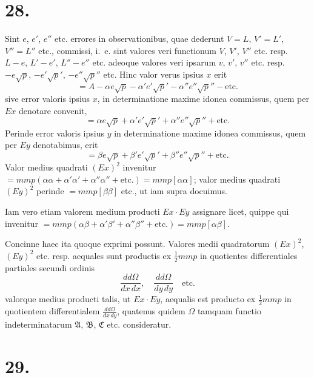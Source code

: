 \documentclass[12pt,a4paper]{book}
\begin{document}
\section*{28.}
\label{sec:art28}

Sint $e$, $e'$, $e''$ etc. errores in observationibus, quae dederunt $V=L$, $V'=L'$, $V''=L''$ etc., commissi, i.~e. sint valores veri functionum $V$, $V'$, $V''$ etc. resp. $L-e$, $L'-e'$, $L''-e''$ etc. adeoque valores veri ipsarum $v$, $v'$, $v''$ etc. resp. $-e\surd p$, $-e'\surd p'$, $-e''\surd p''$ etc. Hinc valor verus ipsius $x$ erit
%
\begin{equation*}
=A-\alpha e\surd p-\alpha'e'\surd p'-\alpha''e''\surd p''-\text{etc.}
\end{equation*}
sive error valoris ipsius $x$, in determinatione maxime idonea commissus, quem per $Ex$ denotare convenit,
%
\begin{equation*}
=\alpha e\surd p+\alpha'e'\surd p'+\alpha''e''\surd p''+\text{etc.}
\end{equation*}
Perinde error valoris ipsius $y$ in determinatione maxime idonea commissus, quem per $Ey$ denotabimus, erit
%
\begin{equation*}
=\beta e\surd p+\beta'e'\surd p'+\beta''e''\surd p''+\text{etc.}
\end{equation*}
Valor medius quadrati $(Ex)^2$ invenitur $=mmp(\alpha\alpha+\alpha'\alpha'+\alpha''\alpha''+\text{etc.})=mmp[\alpha\alpha]$; valor medius quadrati $(Ey)^2$ perinde $=mmp[\beta\beta]$ etc., ut iam supra docuimus.

Iam vero etiam valorem medium producti $Ex\cdot Ey$ assignare licet, quippe qui invenitur $=mmp(\alpha\beta+\alpha'\beta'+\alpha''\beta''+\text{etc.})=mmp[\alpha\beta]$.

Concinne haec ita quoque exprimi possunt. Valores medii quadratorum $(Ex)^2$, $(Ey)^2$ etc. resp. aequales sunt productis ex $\tfrac{1}{2}mmp$ in quotientes differentiales partiales secundi ordinis
%
\begin{equation*}
\frac{dd\Omega}{dx\,dx},\quad\frac{dd\Omega}{dy\,dy}\quad\text{etc.}
\end{equation*}
valorque medius producti talis, ut $Ex\cdot Ey$, aequalis est producto ex $\tfrac{1}{2}mmp$ in quotientem differentialem $\frac{dd\Omega}{dx\,dy}$, quatenus quidem $\Omega$ tamquam functio indeterminatarum $\mathfrak{A}$, $\mathfrak{B}$, $\mathfrak{C}$ etc. consideratur.

\section*{29.}
\label{sec:art29}
\end{document}
